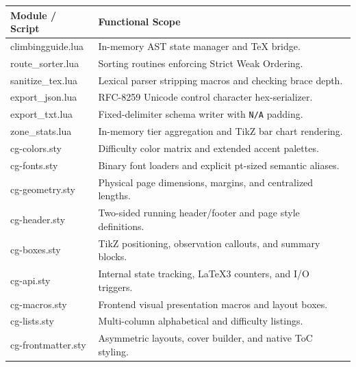 \noindent
\begin{tabularx}{\linewidth}{@{} >{\ttfamily\footnotesize}l >{\footnotesize\arraybackslash}X @{}}
\toprule
\normalfont\textbf{Module / Script} & \textbf{Functional Scope} \\
\midrule
climbingguide.lua & In-memory AST state manager and TeX bridge. \\
route\_sorter.lua & Sorting routines enforcing Strict Weak Ordering. \\
sanitize\_tex.lua & Lexical parser stripping macros and checking brace depth. \\
export\_json.lua & RFC-8259 Unicode control character hex-serializer. \\
export\_txt.lua & Fixed-delimiter schema writer with \texttt{N/A} padding. \\
zone\_stats.lua & In-memory tier aggregation and TikZ bar chart rendering. \\
cg-colors.sty & Difficulty color matrix and extended accent palettes. \\
cg-fonts.sty & Binary font loaders and explicit pt-sized semantic aliases. \\
cg-geometry.sty & Physical page dimensions, margins, and centralized lengths. \\
cg-header.sty & Two-sided running header/footer and page style definitions. \\
cg-boxes.sty & TikZ positioning, observation callouts, and summary blocks. \\
cg-api.sty & Internal state tracking, LaTeX3 counters, and I/O triggers. \\
cg-macros.sty & Frontend visual presentation macros and layout boxes. \\
cg-lists.sty & Multi-column alphabetical and difficulty listings. \\
cg-frontmatter.sty & Asymmetric layouts, cover builder, and native ToC styling. \\
\bottomrule
\end{tabularx}
